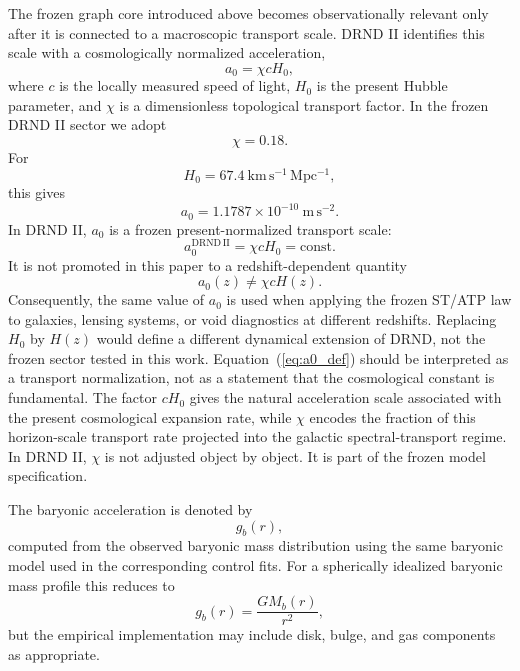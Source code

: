 \documentclass[12pt]{iopart}
\begin{document}
The frozen graph core introduced above becomes observationally relevant only after it is connected to a macroscopic transport scale. DRND II identifies this scale with a cosmologically normalized acceleration,
\begin{equation}
a_0=\chi cH_0,
\label{eq:a0_def}
\end{equation}
where \(c\) is the locally measured speed of light, \(H_0\) is the present Hubble parameter, and \(\chi\) is a dimensionless topological transport factor. In the frozen DRND II sector we adopt
\begin{equation}
\chi=0.18.
\label{eq:chi_value}
\end{equation}
For
\begin{equation}
H_0=67.4~\mathrm{km\,s^{-1}\,Mpc^{-1}},
\end{equation}
this gives
\begin{equation}
a_0
=
1.1787\times 10^{-10}~\mathrm{m\,s^{-2}}.
\label{eq:a0_value}
\end{equation}
In DRND II, \(a_0\) is a frozen present-normalized transport scale:
\begin{equation}
a_0^{\mathrm{DRND\,II}}
=
\chi cH_0
=
\mathrm{const}.
\label{eq:a0_frozen_main}
\end{equation}
It is not promoted in this paper to a redshift-dependent quantity
\begin{equation}
a_0(z)\neq \chi cH(z).
\end{equation}
Consequently, the same value of \(a_0\) is used when applying the frozen ST/ATP law to galaxies, lensing systems, or void diagnostics at different redshifts. Replacing \(H_0\) by \(H(z)\) would define a different dynamical extension of DRND, not the frozen sector tested in this work.
Equation~(\ref{eq:a0_def}) should be interpreted as a transport normalization, not as a statement that the cosmological constant is fundamental. The factor \(cH_0\) gives the natural acceleration scale associated with the present cosmological expansion rate, while \(\chi\) encodes the fraction of this horizon-scale transport rate projected into the galactic spectral-transport regime. In DRND II, \(\chi\) is not adjusted object by object. It is part of the frozen model specification.

The baryonic acceleration is denoted by
\begin{equation}
g_b(r),
\end{equation}
computed from the observed baryonic mass distribution using the same baryonic model used in the corresponding control fits. For a spherically idealized baryonic mass profile this reduces to
\begin{equation}
g_b(r)=\frac{GM_b(r)}{r^2},
\end{equation}
but the empirical implementation may include disk, bulge, and gas components as appropriate.
\end{document}
